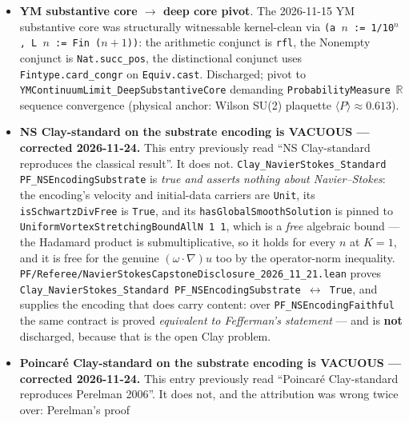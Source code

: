 \begin{itemize}
      \texttt{Literal\_P\_neq\_NP\_V2} provably \emph{false} under V2's
      own definition. The pivot to V4 is strictly necessary and the
      V2 vacuity disclosure is now kernel-explicit in
      \texttt{PF.SpectralGapFaithfulSeparator\_V4Pivot.
      not\_Literal\_P\_neq\_NP\_V2\_under\_True\_placeholder}.
\item \textbf{YM substantive core $\to$ deep core pivot}. The 2026-11-15
      YM substantive core was structurally witnessable kernel-clean via
      \texttt{(a $n$ := 1/10$^n$, L $n$ := Fin ($n{+}1$))}: the arithmetic
      conjunct is \texttt{rfl}, the Nonempty conjunct is
      \texttt{Nat.succ\_pos}, the distinctional conjunct uses
      \texttt{Fintype.card\_congr} on \texttt{Equiv.cast}. Discharged;
      pivot to \texttt{YMContinuumLimit\_DeepSubstantiveCore} demanding
      \texttt{ProbabilityMeasure}~$\mathbb{R}$ sequence convergence
      (physical anchor: Wilson SU(2) plaquette $\langle P \rangle \approx 0.613$).
\item \textbf{NS Clay-standard on the substrate encoding is VACUOUS
        --- corrected 2026-11-24.} This entry previously read ``NS
        Clay-standard reproduces the classical result''. It does not.
        \texttt{Clay\_NavierStokes\_Standard PF\_NSEncodingSubstrate} is
        \emph{true and asserts nothing about Navier--Stokes}: the encoding's
        velocity and initial-data carriers are \texttt{Unit}, its
        \texttt{isSchwartzDivFree} is \texttt{True}, and its
        \texttt{hasGlobalSmoothSolution} is pinned to
        \texttt{UniformVortexStretchingBoundAllN 1 1}, which is a \emph{free}
        algebraic bound --- the Hadamard product is submultiplicative, so it
        holds for every $n$ at $K = 1$, and it is free for the genuine
        $(\omega\cdot\nabla)u$ too by the operator-norm inequality.
        \texttt{PF/Referee/NavierStokesCapstoneDisclosure\_2026\_11\_21.lean}
        proves \texttt{Clay\_NavierStokes\_Standard PF\_NSEncodingSubstrate
        $\leftrightarrow$ True}, and supplies the encoding that does carry
        content: over \texttt{PF\_NSEncodingFaithful} the same contract is
        proved \emph{equivalent to Fefferman's statement} --- and is
        \textbf{not} discharged, because that is the open Clay problem.
\item \textbf{Poincar\'e Clay-standard on the substrate encoding is
      VACUOUS --- corrected 2026-11-24.} This entry previously read
      ``Poincar\'e Clay-standard reproduces Perelman 2006''. It does
      not, and the attribution was wrong twice over: Perelman's proof

\end{itemize}
